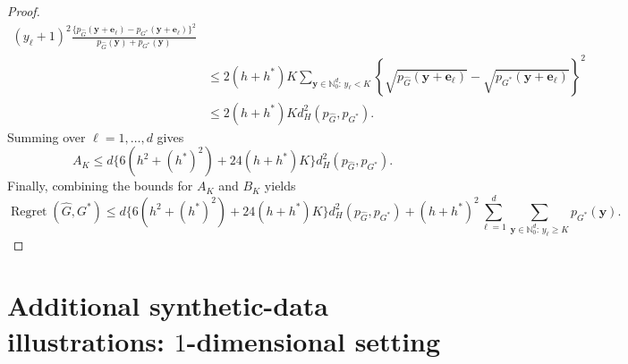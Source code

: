 \documentclass[twoside,12pt]{article}
\begin{document}
\begin{proof}
\begin{align*}
(y_\ell+1)^2
\frac{
\{p_{\widehat G}(\boldsymbol y+\boldsymbol e_\ell)
-
p_{G^\ast}(\boldsymbol y+\boldsymbol e_\ell)\}^2
}{
p_{\widehat G}(\boldsymbol y)+p_{G^\ast}(\boldsymbol y)
}
\\
&\leq
2(h+h^\ast)K
\sum_{\boldsymbol y\in\mathbb N_0^d:\,y_\ell<K}
\left\{
\sqrt{p_{\widehat G}(\boldsymbol y+\boldsymbol e_\ell)}
-
\sqrt{p_{G^\ast}(\boldsymbol y+\boldsymbol e_\ell)}
\right\}^2\\
&\leq 2(h+h^\ast)K
d_H^2(p_{\widehat G},p_{G^\ast}).
\end{align*}
Summing over $\ell=1,\ldots,d$ gives
\[
A_K
\leq
d\Big\{
6(h^2+(h^\ast)^2)
+
24(h+h^\ast)K
\Big\}
d_H^2(p_{\widehat G},p_{G^\ast}).
\]
Finally, combining the bounds for $A_K$ and $B_K$ yields
\[
\operatorname{Regret}(\widehat G,G^\ast)
\leq
d\Big\{
6(h^2+(h^\ast)^2)+24(h+h^\ast)K
\Big\}
d_H^2(p_{\widehat G},p_{G^\ast})
+
(h+h^\ast)^2
\sum_{\ell=1}^d
\sum_{\boldsymbol y\in\mathbb N_0^d:\,y_\ell\geq K}
p_{G^\ast}(\boldsymbol y).
\]
\end{proof}




\section{Additional synthetic-data illustrations: $1$-dimensional setting}\label{app3}
\end{document}
